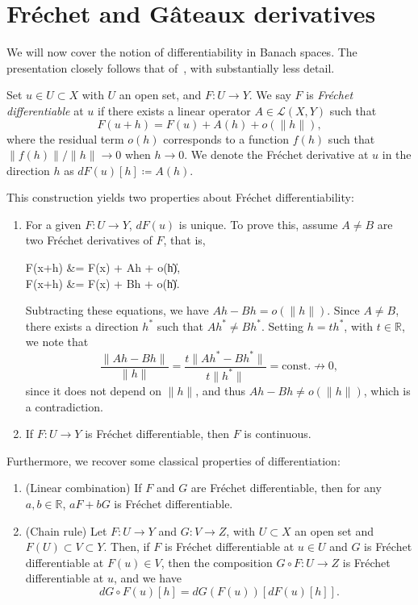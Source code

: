 \section{Fréchet and Gâteaux derivatives}\label{sec:frechet-gateaux-derivatives}
We will now cover the notion of differentiability in Banach spaces. The presentation closely follows that of~\cite{ambrosetti1995primer}, with substantially less detail.
\begin{definition}
    Set $u\in U \subset X$ with $U$ an open set, and $F:U\to Y$. We say $F$ is \emph{Fréchet differentiable} at $u$ if there exists a linear operator $A\in \mathcal{L}(X,Y)$ such that
    \begin{equation}\label{eq:frechet-derivative}
        F(u+h)=F(u)+A(h)+o(\|h\|),
    \end{equation}
    where the residual term $o(h)$ corresponds to a function $f(h)$ such that $\|f(h)\|/\|h\| \to 0$ when $h\to 0$. We denote the Fréchet derivative at $u$ in the direction $h$ as $dF(u)[h] \coloneqq A(h)$.
\end{definition}
This construction yields two properties about Fréchet differentiability:
\begin{enumerate}
    \item For a given $F:U\to Y$, $dF(u)$ is unique. To prove this, assume $A\neq B$ are two Fréchet derivatives of $F$, that is, 
    \begin{tightalign*}
            F(x+h) &= F(x) + Ah + o(\|h\|), \\
            F(x+h) &= F(x) + Bh + o(\|h\|).
    \end{tightalign*}
    Subtracting these equations, we have $Ah - Bh = o(\|h\|)$. Since $A\neq B$, there exists a direction $h^*$ such that $Ah^* \neq Bh^*$. Setting $h=th^*$, with $t\in \mathbb{R}$, we note that
    \begin{equation*}
        \frac{\|Ah-Bh\|}{\|h\|} = \frac{t\|Ah^*-Bh^*\|}{t\|h^*\|} = \text{const.} \nrightarrow 0,
    \end{equation*}
    since it does not depend on $\|h\|$, and thus $Ah - Bh \neq o(\|h\|)$, which is a contradiction. 
    \item If $F:U\to Y$ is Fréchet differentiable, then $F$ is continuous.
\end{enumerate}

Furthermore, we recover some classical properties of differentiation:
\begin{enumerate}
    \item (Linear combination) If $F$ and $G$ are Fréchet differentiable, then for any $a,b\in\mathbb{R}$, $aF+bG$ is Fréchet differentiable.
    \item (Chain rule) Let $F:U\to Y$ and $G:V\to Z$, with $U\subset X$ an open set and $F(U)\subset V\subset Y$. Then, if $F$ is Fréchet differentiable at $u\in U$ and $G$ is Fréchet differentiable at $F(u)\in V$, then the composition $G\circ F:U\to Z$ is Fréchet differentiable at $u$, and we have
    \begin{equation*}
        dG\circ F(u)[h] = dG(F(u))[dF(u)[h]].
    \end{equation*}
\end{enumerate}

